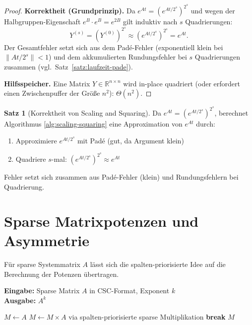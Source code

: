 \documentclass[a4paper,12pt]{report}
\theoremstyle{definition}
\newtheorem{satz}{Satz}
\begin{document}
\begin{proof}
		\textbf{Korrektheit (Grundprinzip).} Da $e^{At} = (e^{At/2^s})^{2^s}$ und wegen der Halbgruppen-Eigenschaft $e^{B} \cdot e^{B} = e^{2B}$ gilt induktiv nach $s$ Quadrierungen:
		\[
			Y^{(s)} = (Y^{(0)})^{2^s} \approx (e^{At/2^s})^{2^s} = e^{At}.
		\]
		Der Gesamtfehler setzt sich aus dem Padé-Fehler (exponentiell klein bei $\|At/2^s\| < 1$) und dem akkumulierten Rundungsfehler bei $s$ Quadrierungen zusammen (vgl.\ Satz~\ref{satz:laufzeit-pade}).

		\textbf{Hilfsspeicher.} Eine Matrix $Y \in \mathbb{R}^{n \times n}$ wird in-place quadriert (oder erfordert einen Zwischenpuffer der Größe $n^2$): $\Theta(n^2)$.
	\end{proof}

	\begin{satz}[Korrektheit von Scaling and Squaring]
		Da $e^{At} = (e^{At/2^s})^{2^s}$, berechnet Algorithmus \ref{alg:scaling-squaring} eine Approximation von $e^{At}$ durch:
		\begin{enumerate}
			\item Approximiere $e^{At/2^s}$ mit Padé (gut, da Argument klein)
			\item Quadriere $s$-mal: $(e^{At/2^s})^{2^s} \approx e^{At}$
		\end{enumerate}
		
		Fehler setzt sich zusammen aus Padé-Fehler (klein) und Rundungsfehlern bei Quadrierung.
	\end{satz}
	
	\section{Sparse Matrixpotenzen und Asymmetrie}
	
	Für sparse Systemmatrix $A$ lässt sich die spalten-priorisierte Idee auf die Berechnung der Potenzen übertragen.
	
	\begin{algorithm}[H]
		\caption{Sparse Matrixpotenz-Berechnung}
		\label{alg:sparse-matrix-power}
		\textbf{Eingabe:} Sparse Matrix $A$ in CSC-Format, Exponent $k$ \\
		\textbf{Ausgabe:} $A^k$
		\begin{algorithmic}[1]
			\State $M \gets A$
			\State $M \gets M \times A$ via spalten-priorisierte sparse Multiplikation
			\State \textbf{break} 
			\EndIf
			\EndFor
			\State \Return $M$
		\end{algorithmic}
	\end{algorithm}
\end{document}

